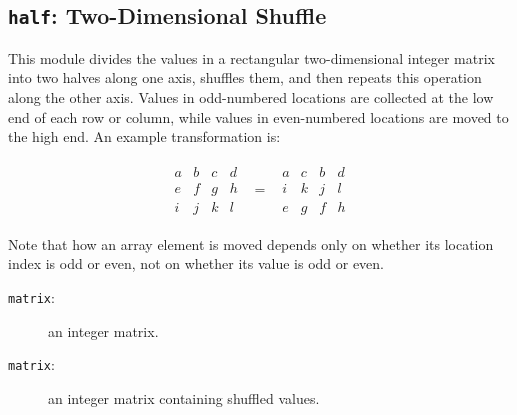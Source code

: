 \subsection{{\tt{half}}: Two-Dimensional Shuffle\label{s:toys-half}}

This module divides the values in a rectangular two-dimensional integer matrix into two halves along one axis,
shuffles them,
and then repeats this operation along the other axis.
Values in odd-numbered locations are collected at the low end of each row or column,
while values in even-numbered locations are moved to the high end.
An example transformation is:

\begin{eqnarray*}
\begin{array}{cccc}
a & b & c & d \\
e & f & g & h \\
i & j & k & l
\end{array}
& = &
\begin{array}{cccc}
a & c & b & d \\
i & k & j & l \\
e & g & f & h
\end{array}
\end{eqnarray*}

Note that how an array element is moved depends only on whether its location index is odd or even,
not on whether its value is odd or even.

{}

\begin{description}
\item[{\tt{matrix}}:]
	an integer matrix.
\end{description}

{\outputspec}

\begin{description}
\item[{\tt{matrix}}:]
	an integer matrix containing shuffled values.
\end{description}
